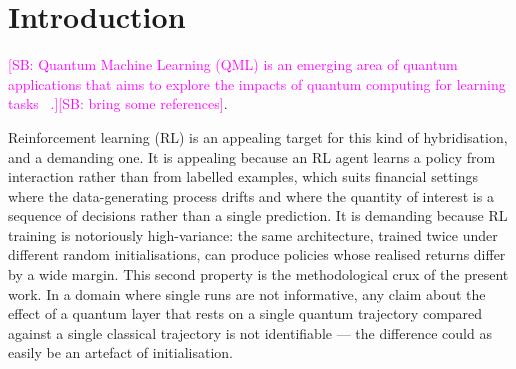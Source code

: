 \documentclass[aps,floatfix,superscriptaddress,twocolumn,tightenlines,amsmath,amssymb,nofootinbib,10pt,longbibliography,prl]{revtex4-2}
\newcommand{\sam}[1]{\textcolor{magenta}{[SB: {#1}]}}
\begin{document}
\begin{abstract}
localises the effect in the presence of the variational block rather than in the dimension of the Hilbert space it acts on --- an observation consistent with the encoding-limited frequency spectrum of a single-layer angle embedding read out through local observables.
\sam{It still needs improvement, but the previous version was too long.}
\end{abstract}
\maketitle

\section{Introduction}
\label{sec:introduction}

\sam{Quantum Machine Learning (QML) is an emerging area of quantum applications that aims to explore the impacts of quantum computing for learning tasks ~\cite{Huang2022Quantumadvantagein, Liu2021Arigorousandrobust}.}\sam{bring some references}.

Reinforcement learning (RL) is an appealing target for this kind of
hybridisation, and a demanding one. It is appealing because an RL agent learns a policy from interaction rather than from labelled examples, which suits financial settings where the data-generating process drifts and where the
quantity of interest is a sequence of decisions rather than a single
prediction. It is demanding because RL training is notoriously
high-variance: the same architecture, trained twice under different random
initialisations, can produce policies whose realised returns differ by a wide
margin. This second property is the methodological crux of the present work.
In a domain where single runs are not informative, any claim about the effect
of a quantum layer that rests on a single quantum trajectory compared against a
single classical trajectory is not identifiable --- the difference could as
easily be an artefact of initialisation.
\end{document}
